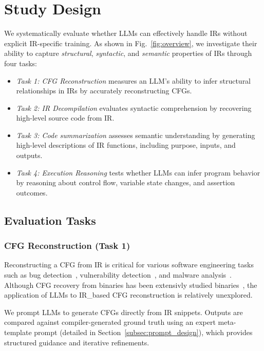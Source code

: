 \section{Study Design}
\label{sec:experimental_setup}
We systematically evaluate whether LLMs can effectively handle IRs without explicit IR-specific training. As shown in Fig.~\ref{fig:overview}, we investigate their ability to capture \emph{structural}, \emph{syntactic}, and \emph{semantic} properties of IRs through four tasks: 
\begin{itemize}[nolistsep,leftmargin=*]
\renewcommand{\labelitemi}{$\triangleright$}
    \item \emph{Task 1: CFG Reconstruction} measures an LLM’s ability to infer structural relationships in IRs by accurately reconstructing CFGs.
    \item \emph{Task 2: IR Decompilation} evaluates syntactic comprehension by recovering high-level source code from IR.
    \item \emph{Task 3: Code summarization} assesses semantic understanding by generating high-level descriptions of IR functions, including purpose, inputs, and outputs.
    \item \emph{Task 4: Execution Reasoning} tests whether LLMs can infer program behavior by reasoning about control flow, variable state changes, and assertion outcomes.
\end{itemize}

\subsection{Evaluation Tasks}


\subsubsection{CFG Reconstruction (Task 1)}


\label{subsec:cfg_evaluation}

Reconstructing a CFG from IR is critical for various software engineering tasks such as bug detection~\cite{zhang2023bugdetecting}, vulnerability detection~\cite{li2018vuldeepecker}, and malware analysis~\cite{anju2010malware}.
Although CFG recovery from binaries has been extensivly studied binaries~\cite{andriesse2016depth,pang2021sok,shoshitaishvili2016sok}, the application of LLMs to IR\_based CFG reconstruction is relatively unexplored. 



We prompt LLMs to generate CFGs directly from IR snippets. Outputs are compared against compiler-generated ground truth using an expert meta-template prompt (detailed in Section~\ref{subsec:prompt_design}), which provides structured guidance and iterative refinements.


